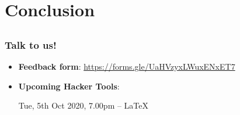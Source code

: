 \documentclass[12pt]{beamer}
\begin{document}
\section{Conclusion}
\subsection{}
\begin{frame}
  \frametitle{Talk to us!}
  \begin{itemize}
    \item \textbf{Feedback form}: \url{https://forms.gle/UaHVzyxLWuxENxET7}
    \item \textbf{Upcoming Hacker Tools}:

          Tue, 5th Oct 2020, 7.00pm -- LaTeX
  \end{itemize}
\end{frame}
\end{document}
